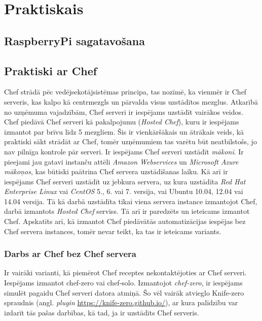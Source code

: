 \chapter{Praktiskais}

\section{RaspberryPi sagatavošana}

\section{Praktiski ar Chef}
Chef strādā pēc vedējsekotājsistēmas principa, tas nozīmē, ka vienmēr ir Chef serveris, kas kalpo kā centrmezgls un pārvalda visus uzstādītos mezglus. Atkarībā no uzņēmuma vajadzībām, Chef serveri ir iespējams uzstādīt vairākos veidos. Chef piedāvā Chef serveri kā pakalpojumu (\textit{Hosted Chef}), kuru ir iespējams izmantot par brīvu līdz 5 mezgliem. Šis ir vienkāršākais un ātrākais veids, kā praktiski sākt strādāt ar Chef, tomēr uzņēmumiem tas varētu būt neatbilstošs, jo nav pilnīga kontrole pār serveri. Ir iespējams Chef serveri uzstādīt \textit{mākonī}. Ir pieejami jau gatavi instanču attēli \textit{Amazon Webservices} un \textit{Microsoft Azure} \textit{mākoņos}, kas būtiski paātrina Chef servera uzstādīšanas laiku. Kā arī ir iespējams Chef serveri uzstādīt uz jebkura servera, uz kura uzstādīta \textit{Red Hat Enterprise Linux} vai \textit{CentOS} 5., 6. vai 7. versija, vai Ubuntu 10.04, 12.04 vai 14.04 versija.
Tā kā darbā uzstādīta tikai viena servera instance izmantojot Chef, darbā izmantots \textit{Hosted Chef} serviss. Tā arī ir paredzēts un ieteicams izmantot Chef.
Apskatīts arī, kā izmantot Chef piedāvātās automatizācijas iespējas bez Chef servera instances, tomēr nevar teikt, ka tas ir ieteicams variants.



\subsection{Darbs ar Chef bez Chef servera}
Ir vairāki varianti, kā piemērot Chef receptes nekontaktējoties ar Chef serveri. Iespējams izmantot chef-zero vai chef-solo.
Izmantojot \textit{chef-zero}, ir iespējams simulēt pagaidu Chef serveri datora atmiņā. Šo vēl vairāk atvieglo Knife-zero spraudnis (angl. \textit{plugin} \url{https://knife-zero.github.io/}), ar kura palīdzību var izdarīt tās pašas darbības, kā tad, ja ir uzstādīts Chef serveris.

